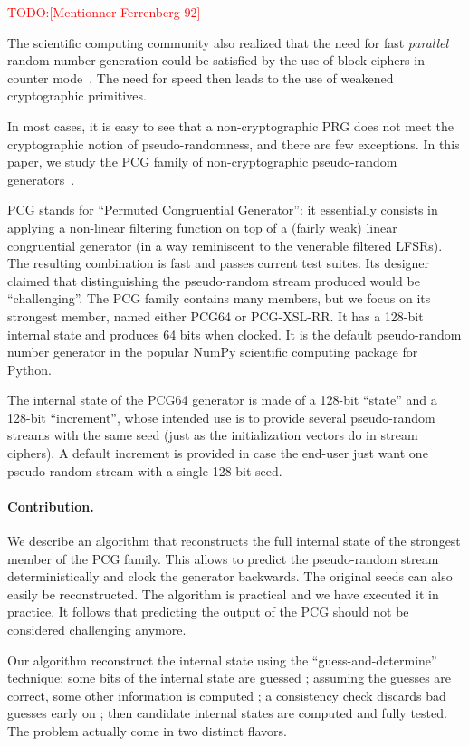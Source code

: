 \documentclass[preprint,svgnames]{iacrtrans}
\newcommand{\todo}[1]{\textcolor{red}{TODO:[#1]}}
\begin{document}
\todo{Mentionner Ferrenberg 92}

The scientific computing community also realized that the need for fast
\emph{parallel} random number generation could be satisfied by the use of block
ciphers in counter mode~\cite{Salmon11}. The need for speed then leads to the
use of weakened cryptographic primitives.

In most cases, it is easy to see that a non-cryptographic PRG does not meet the
cryptographic notion of pseudo-randomness, and there are few exceptions. In this
paper, we study the \textsf{PCG} family of non-cryptographic pseudo-random
generators~\cite{melissapaper,melissaweb}.

\textsf{PCG} stands for ``Permuted Congruential Generator'': it essentially
consists in applying a non-linear filtering function on top of a (fairly weak)
linear congruential generator (in a way reminiscent to the venerable filtered
LFSRs). The resulting combination is fast and passes current test suites. Its
designer claimed that distinguishing the pseudo-random stream produced would be
``challenging''. The \textsf{PCG} family contains many members, but we focus on
its strongest member, named either \textsf{PCG64} or \textsf{PCG-XSL-RR}. It has
a 128-bit internal state and produces 64 bits when clocked. It is the default
pseudo-random number generator in the popular \textsf{NumPy} scientific
computing package for \textsf{Python}.

The internal state of the \textsf{PCG64} generator is made of a 128-bit
``state'' and a 128-bit ``increment'', whose intended use is to provide several
pseudo-random streams with the same seed (just as the initialization vectors do
in stream ciphers). A default increment is provided in case the end-user just
want one pseudo-random stream with a single 128-bit seed.

\paragraph{Contribution.} We describe an algorithm that reconstructs the full
internal state of the strongest member of the \textsf{PCG} family. This allows
to predict the pseudo-random stream deterministically and clock the generator
backwards. The original seeds can also easily be reconstructed. The algorithm is
practical and we have executed it in practice. It follows that predicting the
output of the \textsf{PCG} should not be considered challenging anymore.

Our algorithm reconstruct the internal state using the ``guess-and-determine''
technique: some bits of the internal state are guessed ; assuming the guesses
are correct, some other information is computed ; a consistency check discards
bad guesses early on ; then candidate internal states are computed and fully
tested. The problem actually come in two distinct flavors.
\end{document}
